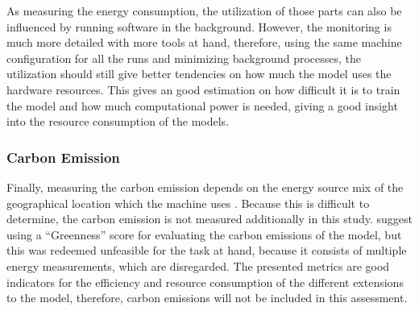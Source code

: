 As measuring the energy consumption, the utilization of those parts can also be influenced by running software in the background. However, the monitoring is much more detailed with more tools at hand, therefore, using the same machine configuration for all the runs and minimizing background processes, the utilization should still give better tendencies on how much the model uses the hardware resources. This gives an good estimation on how difficult it is to train the model and how much computational power is needed, giving a good insight into the resource consumption of the models.

\subsubsection*{Carbon Emission}

Finally, measuring the carbon emission depends on the energy source mix of the geographical location which the machine uses \autocite{Mehlin.Schacht.ea2023}. Because this is difficult to determine, the carbon emission is not measured additionally in this study. \textcite{Li.Jiang.ea2021} suggest using a \enquote{Greenness} score for evaluating the carbon emissions of the model, but this was redeemed unfeasible for the task at hand, because it consists of multiple energy measurements, which are disregarded. The presented metrics are good indicators for the efficiency and resource consumption of the different extensions to the model, therefore, carbon emissions will not be included in this assessment.
